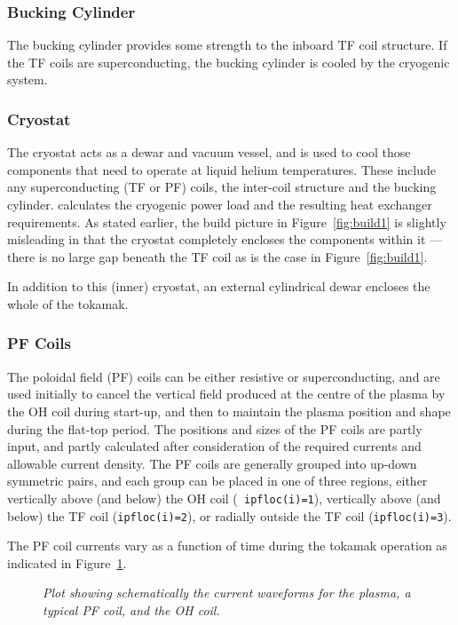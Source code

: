 \subsubsection{Bucking Cylinder}
The bucking cylinder provides some strength to the inboard TF coil
structure. If the TF coils are superconducting, the bucking cylinder is cooled
by the cryogenic system.

\subsubsection{Cryostat}
The cryostat acts as a dewar and vacuum vessel, and is used to cool those
components that need to operate at liquid helium temperatures. These include
any superconducting (TF or PF) coils, the inter-coil structure and the bucking
cylinder. \PS calculates the cryogenic power load and the resulting heat
exchanger requirements. As stated earlier, the build picture in
Figure~\ref{fig:build1} is slightly misleading in that the cryostat completely
encloses the components within it --- there is no large gap beneath the TF
coil as is the case in Figure~\ref{fig:build1}.

In addition to this (inner) cryostat, an external cylindrical dewar encloses
the whole of the tokamak.

\subsubsection{PF Coils}
The poloidal field (PF) coils can be either resistive or superconducting, and
are used initially to cancel the vertical field produced at the centre of the
plasma by the OH coil during start-up, and then to maintain the plasma
position and shape during the flat-top period. The positions and sizes of the
PF coils are partly input, and partly calculated after consideration of the
required currents and allowable current density. The PF coils are generally
grouped into up-down symmetric pairs, and each group can be placed in one of
three regions, either vertically above (and below) the OH coil ({\tt
ipfloc(i)=1}), vertically above (and below) the TF coil ({\tt ipfloc(i)=2}),
or radially outside the TF coil ({\tt ipfloc(i)=3}).

The PF coil currents vary as a function of time during the tokamak operation
as indicated in Figure~\ref{fig:current_vs_time}.

\begin{figure}
\centerline{}
\vspace{-12mm}
\caption[IvsT]
{\it Plot showing schematically the current waveforms for the plasma, a
typical PF coil, and the OH coil.}
\label{fig:current_vs_time}
\end{figure}

